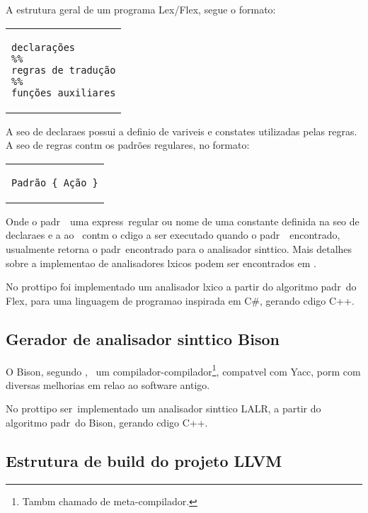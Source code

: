 A estrutura geral de um programa Lex/Flex, segue o formato:

\begin{center}
\begin{tabular}{p{5cm}}
\begin{verbatim}
declarações
%%
regras de tradução
%%
funções auxiliares
\end{verbatim}
\end{tabular}
\end{center}

A se\ca o de declara\co es possui a defini\ca o de vari\ah veis e constates utilizadas pelas regras. A se\ca o de regras cont\eh m os padr\~oes regulares, no formato:

\begin{center}
\begin{tabular}{p{5cm}}
\begin{verbatim}
Padrão { Ação }
\end{verbatim}
\end{tabular}
\end{center}

Onde o padr\ao\ \eh\ uma express\ao\ regular ou nome de uma constante definida na se\ca o de declara\co es e a a\ca o \eh\ cont\eh m o c\oh digo a ser executado quando o padr\ao\ \eh\ encontrado, usualmente retorna o padr\ao\ encontrado para o analisador sint\ah tico. Mais detalhes sobre a implementa\ca o de analisadores l\eh xicos podem ser encontrados em \cite{Niemann99}.

No prot\oh tipo foi implementado um analisador l\eh xico a partir do algoritmo padr\ao\ do Flex, para uma linguagem de programa\ca o inspirada em C\#, gerando c\oh digo C++.

\subsection{Gerador de analisador sint\ah tico Bison}

O Bison, segundo \cite{wiki:bison}, \eh\ um compilador-compilador\footnote{Tamb\eh m chamado de meta-compilador.}, compat\ih vel com Yacc, por\eh m com diversas melhorias em rela\ca o ao software antigo.

No prot\oh tipo ser\ah\ implementado um analisador sint\ah tico LALR, a partir do algoritmo padr\ao\ do Bison, gerando c\oh digo C++.

\subsection{Estrutura de build do projeto LLVM}

